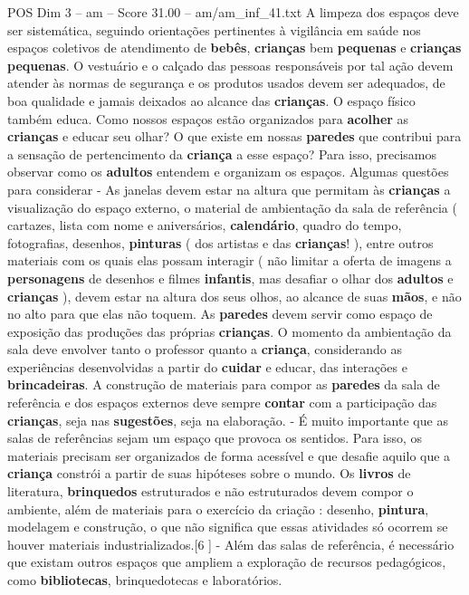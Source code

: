 \begin{textsample}{POS Dim 3 – am – Score 31.00 – am/am\_inf\_41.txt}
A limpeza dos espaços deve ser sistemática, seguindo orientações pertinentes à vigilância em saúde nos espaços coletivos de atendimento de \textbf{bebês}, \textbf{crianças} bem \textbf{pequenas} e \textbf{crianças} \textbf{pequenas}.
O vestuário e o calçado das pessoas responsáveis por tal ação devem atender às normas de segurança e os produtos usados devem ser adequados, de boa qualidade e jamais deixados ao alcance das \textbf{crianças}.
O espaço físico também educa.
Como nossos espaços estão organizados para \textbf{acolher} as \textbf{crianças} e educar seu olhar?
O que existe em nossas \textbf{paredes} que contribui para a sensação de pertencimento da \textbf{criança} a esse espaço?
Para isso, precisamos observar como os \textbf{adultos} entendem e organizam os espaços.
Algumas questões para considerar - As janelas devem estar na altura que permitam às \textbf{crianças} a visualização do espaço externo, o material de ambientação da sala de referência ( cartazes, lista com nome e aniversários, \textbf{calendário}, quadro do tempo, fotografias, desenhos, \textbf{pinturas} ( dos artistas e das \textbf{crianças}! ), entre outros materiais com os quais elas possam interagir ( não limitar a oferta de imagens a \textbf{personagens} de desenhos e filmes \textbf{infantis}, mas desafiar o olhar dos \textbf{adultos} e \textbf{crianças} ), devem estar na altura dos seus olhos, ao alcance de suas \textbf{mãos}, e não no alto para que elas não toquem.
As \textbf{paredes} devem servir como espaço de exposição das produções das próprias \textbf{crianças}.
O momento da ambientação da sala deve envolver tanto o professor quanto a \textbf{criança}, considerando as experiências desenvolvidas a partir do \textbf{cuidar} e educar, das interações e \textbf{brincadeiras}.
A construção de materiais para compor as \textbf{paredes} da sala de referência e dos espaços externos deve sempre \textbf{contar} com a participação das \textbf{crianças}, seja nas \textbf{sugestões}, seja na elaboração. - É muito importante que as salas de referências sejam um espaço que provoca os sentidos.
Para isso, os materiais precisam ser organizados de forma acessível e que desafie aquilo que a \textbf{criança} constrói a partir de suas hipóteses sobre o mundo.
Os \textbf{livros} de literatura, \textbf{brinquedos} estruturados e não estruturados devem compor o ambiente, além de materiais para o exercício da criação : desenho, \textbf{pintura}, modelagem e construção, o que não significa que essas atividades só ocorrem se houver materiais industrializados.[6 ] - Além das salas de referência, é necessário que existam outros espaços que ampliem a exploração de recursos pedagógicos, como \textbf{bibliotecas}, brinquedotecas e laboratórios.

\end{textsample}
